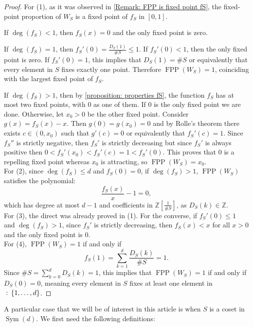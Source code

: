 \documentclass{amsart}
\def\set#1{{\def\st{\;:\;}\left\{#1\right\}}}
\def\ZZ{\mathbb Z}
\DeclareMathOperator{\FPP}{FPP}
\DeclareMathOperator{\Sym}{Sym}
\DeclareMathOperator{\st}{st}
\begin{document}
\begin{proof}
For (1), as it was observed in \cref{Remark: FPP is fixed point fS}, the fixed-point proportion of $W_S$ is a fixed point of $f_S$ in $[0,1]$. 

If $\deg(f_S) < 1$, then $f_S(x) = 0$ and the only fixed point is zero. 

If $\deg(f_S) = 1$, then $f_S'(0) = \frac{D_S(1)}{\# S} \leq 1$. If $f_S'(0) < 1$, then the only fixed point is zero. If $f_S'(0) = 1$, this implies that $D_S(1) = \# S$ or equivalently that every element in $S$ fixes exactly one point. Therefore $\FPP(W_S) = 1$, coinciding with the largest fixed point of $f_S$.

If $\deg(f_S) > 1$, then by \cref{proposition: properties fS}, the function $f_S$ has at most two fixed points, with $0$ as one of them. If $0$ is the only fixed point we are done. Otherwise, let $x_0 > 0$ be the other fixed point. Consider $g(x) = f_S(x)-x$. Then $g(0) = g(x_0) = 0$ and by Rolle's theorem there exists $c \in (0,x_0)$ such that $g'(c) = 0$ or equivalently that $f_S'(c) = 1$. Since $f_S''$ is strictly negative, then $f_S'$ is strictly decreasing but since $f_S'$ is always positive then $0 < f_S'(x_0) < f_S'(c) = 1 < f_S'(0)$. This proves that $0$ is a repelling fixed point whereas $x_0$ is attracting, so $\FPP(W_S) = x_0$. \\

For (2), since $\deg(f_S) \leq d$ and $f_S(0) = 0$, if $\deg(f_S) > 1$, $\FPP(W_S)$ satisfies the polynomial: $$\frac{f_S(x)}{x} - 1 = 0,$$ which has degree at most $d-1$ and coefficients in $\ZZ\left[\frac{1}{\# S}\right]$, as $D_S(k) \in \ZZ$. \\

For (3), the direct was already proved in (1). For the converse, if $f_S'(0) \leq 1$ and $\deg(f_S) > 1$, since $f_S'$ is strictly decreasing, then $f_S(x) < x$ for all $x > 0$ and the only fixed point is $0$. \\

For (4), $\FPP(W_S) = 1$ if and only if $$f_S(1) = \sum_{k = 1}^d \frac{D_S(k)}{\# S} = 1.$$ Since $\#S = \sum_{k = 0}^d D_S(k) = 1$, this implies that $\FPP(W_S) = 1$ if and only if $D_S(0) = 0$, meaning every element in $S$ fixes at least one element in $\set{1,\dots,d}$. 
\end{proof}

A particular case that we will be of interest in this article is when $S$ is a coset in $\Sym(d)$. We first need the following definitions:
\end{document}
